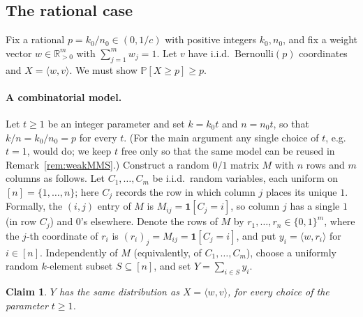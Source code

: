 \documentclass[11pt]{amsart}
\theoremstyle{plain}
\newtheorem{claim}[theorem]{Claim}
\theoremstyle{definition}
\def\bR{\mathbb{R}}
\def\Pb{\mathbb{P}}
\begin{document}
\subsection{The rational case}

Fix a rational $p=k_0/n_0\in(0,1/c)$ with positive integers $k_0,n_0$, and fix a
weight vector $w\in\bR_{>0}^m$ with $\sum_{j=1}^m w_j=1$. Let $v$ have i.i.d.\
$\mathrm{Bernoulli}(p)$ coordinates and $X=\langle w,v\rangle$. We must show
$\Pb[X\ge p]\ge p$.

\paragraph{A combinatorial model.}
Let $t\ge1$ be an integer parameter and set $k=k_0t$ and $n=n_0t$, so that
$k/n=k_0/n_0=p$ for every $t$. (For the main argument any single choice of $t$,
e.g.\ $t=1$, would do; we keep $t$ free only so that the same model can be reused
in Remark~\ref{rem:weakMMS}.) Construct a random $0/1$ matrix $M$ with
$n$ rows and $m$ columns as follows. Let $C_1,\dots,C_m$ be i.i.d.\ random
variables, each uniform on $[n]=\{1,\dots,n\}$; here $C_j$ records the row in which
column $j$ places its unique $1$. Formally, the $(i,j)$ entry of $M$ is
$M_{ij}=\mathbf 1[C_j=i]$, so column $j$ has a single $1$ (in row $C_j$) and $0$'s
elsewhere. Denote the rows of $M$ by $r_1,\dots,r_n\in\{0,1\}^m$, where the
$j$-th coordinate of $r_i$ is $(r_i)_j=M_{ij}=\mathbf 1[C_j=i]$, and put
$y_i=\langle w,r_i\rangle$ for $i\in[n]$. Independently of $M$ (equivalently, of
$C_1,\dots,C_m$), choose a uniformly random $k$-element subset $S\subseteq[n]$, and
set $Y=\sum_{i\in S}y_i$.

\begin{claim}\label{cl:dist}
$Y$ has the same distribution as $X=\langle w,v\rangle$, for every choice of the
parameter $t\ge1$.
\end{claim}
\end{document}
